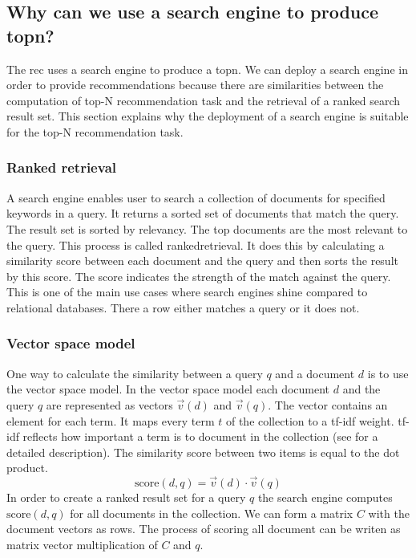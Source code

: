 \subsection{Why can we use a search engine to produce \gls{topn}?}
\label{sec:relation}

The \gls{rec} uses a search engine to produce a \gls{topn}. We can deploy a search engine in order to provide recommendations because there are similarities between the computation of top-N recommendation task and the retrieval of a ranked search result set.
 This section explains why the deployment of a search engine is suitable for the top-N recommendation task.

\subsubsection{Ranked retrieval}
A search engine enables user to search a collection of documents for specified keywords in a query. It returns a sorted set of documents that match the query. The result set is sorted by relevancy. The top documents are the most relevant to the query. This process is called \gls{rankedretrieval}. It does this by calculating a similarity score between each document and the query and then sorts the result by this score. The score indicates the strength of the match against the query. This is one of the main use cases where search engines shine compared to relational databases. There a row either matches a query or it does not. 
\subsubsection{Vector space model}
One way to calculate the similarity between a query $q$ and a document $d$ is to use the vector space model.
In the vector space model each document $d$ and the query $q$ are represented as vectors $\vec{v}(d)$ and $\vec{v}(q)$. The vector contains an element for each term. It maps every term $t$ of the collection to a tf-idf weight. tf-idf reflects how important a term is to document in the collection (see \cite{Manning} for a detailed description). 
The similarity score between two items is equal to the dot product.
\begin{equation}
  \label{eq:score}
  \text{score}(d,q) = \vec{v}(d) \cdot \vec{v}(q)
\end{equation}
In order to create a ranked result set for a query $q$ the search engine computes $\text{score}(d,q)$ for all documents in the collection. We can form a matrix $C$ with the document vectors as rows. The process of scoring all document can be writen as matrix vector multiplication of $C$ and $q$. 

